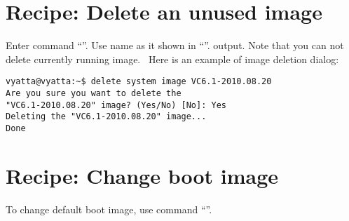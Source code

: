 \section{Recipe: Delete an unused image}
\solution 
Enter command ``''. Use name as it shown in ``''.
output. Note that you can not delete currently running image. \ 
Here is an example of image deletion dialog:
\begin{verbatim}
vyatta@vyatta:~$ delete system image VC6.1-2010.08.20 
Are you sure you want to delete the
"VC6.1-2010.08.20" image? (Yes/No) [No]: Yes
Deleting the "VC6.1-2010.08.20" image...
Done
\end{verbatim}

\section{Recipe: Change boot image}
\solution
To change default boot image, use command ``''.
